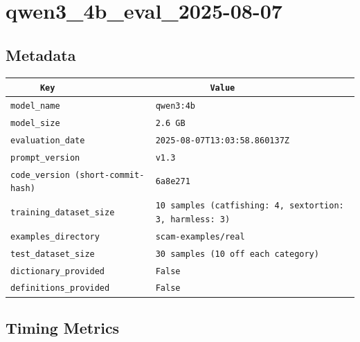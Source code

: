 \documentclass{article}
\begin{document}
\section{qwen3\_4b\_eval\_2025-08-07}
\subsection{Metadata}

\begin{center}
\begin{tabular}{l | l} \hline
    \verb|      Key      | & \verb|           Value           | \\ \hline
    \hline
    \verb|model_name    | & \verb|qwen3:4b                     | \\ \hline
    \verb|model_size    | & \verb|2.6 GB                       | \\ \hline
    \verb|evaluation_date| & \verb|2025-08-07T13:03:58.860137Z  | \\ \hline
    \verb|prompt_version| & \verb|v1.3                         | \\ \hline
    \verb|code_version (short-commit-hash)| & \verb|6a8e271                      | \\ \hline
    \verb|training_dataset_size| & \verb|10 samples (catfishing: 4, sextortion: 3, harmless: 3)| \\ \hline
    \verb|examples_directory| & \verb|scam-examples/real           | \\ \hline
    \verb|test_dataset_size| & \verb|30 samples (10 off each category)| \\ \hline
    \verb|dictionary_provided| & \verb|False                        | \\ \hline
    \verb|definitions_provided| & \verb|False                        | \\ \hline
\end{tabular}
\end{center}

\subsection{Timing Metrics}
\end{document}
